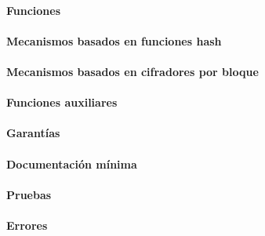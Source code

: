 \paragraph{Funciones}

\paragraph{Mecanismos basados en funciones hash}

\paragraph{Mecanismos basados en cifradores por bloque}

\paragraph{Funciones auxiliares}

\paragraph{Garantías}

\paragraph{Documentación mínima}

\paragraph{Pruebas}

\paragraph{Errores}
